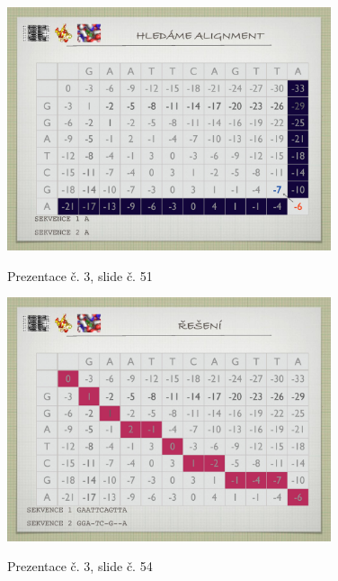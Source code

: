 \documentclass[DIV=8]{scrreprt}
\begin{document}
\begin{figure}
    \caption{Prezentace č. 3, slide č. 51}
    \includegraphics[width=0.85\textwidth]{slides-3/slide-51.jpg}
    \centering
    \label{slides-3-slide-51}
\end{figure}
\begin{figure}
    \caption{Prezentace č. 3, slide č. 54}
    \includegraphics[width=0.85\textwidth]{slides-3/slide-54.jpg}
    \centering
    \label{slides-3-slide-54}
\end{figure}
\end{document}
